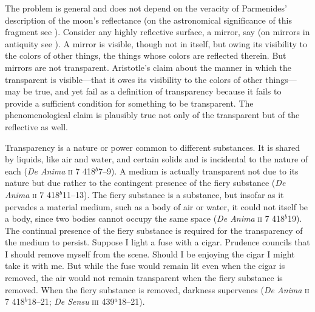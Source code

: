 The problem is general and does not depend on the veracity of Parmenides' description of the moon's reflectance (on the astronomical significance of this fragment see \citealt{Popper:1998aa}). Consider any highly reflective surface, a mirror, say (on mirrors in antiquity see \citealt{Schweig:1941yu}). A mirror is visible, though not in itself, but owing its visibility to the colors of other things, the things whose colors are reflected therein. But mirrors are not transparent. Aristotle's claim about the manner in which the transparent is visible---that it owes its visibility to the colors of other things---may be true, and yet fail as a definition of transparency because it fails to provide a sufficient condition for something to be transparent. The phenomenological claim is plausibly true not only of the transparent but of the reflective as well.

Transparency is a nature or power common to different substances. It is shared by liquids, like air and water, and certain solids and is incidental to the nature of each (\emph{De Anima} \textsc{ii} 7 418\( ^{b} \)7--9). A medium is actually transparent not due to its nature but due rather to the contingent presence of the fiery substance (\emph{De Anima} \textsc{ii} 7 418\( ^{b} \)11--13). The fiery substance is a substance, but insofar as it pervades a material medium, such as a body of air or water, it could not itself be a body, since two bodies cannot occupy the same space (\emph{De Anima} \textsc{ii} 7 418\( ^{b} \)19). The continual presence of the fiery substance is required for the transparency of the medium to persist. Suppose I light a fuse with a cigar. Prudence councils that I should remove myself from the scene. Should I be enjoying the cigar I might take it with me. But while the fuse would remain lit even when the cigar is removed, the air would not remain transparent when the fiery substance is removed. When the fiery substance is removed, darkness supervenes (\emph{De Anima} \textsc{ii} 7 418\( ^{b} \)18--21; \emph{De Sensu} \textsc{iii} 439\( ^{a} \)18--21). 

